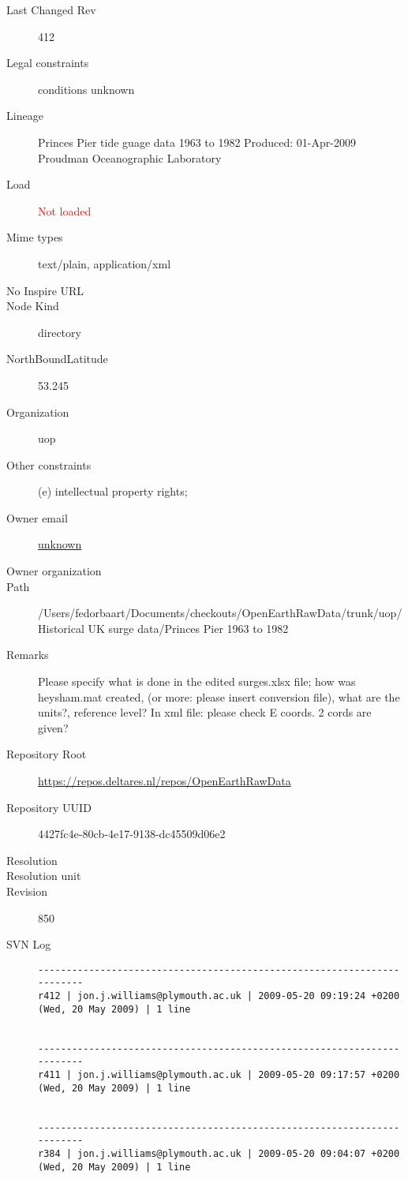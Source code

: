 \documentclass[9]{report}
\begin{document}
\begin{description}
  \item[Last Changed Rev] 412
  \item[Legal constraints] conditions unknown
  \item[Lineage] Princes Pier tide guage data 1963 to 1982
Produced: 01-Apr-2009
Proudman Oceanographic Laboratory
  \item[Load] \textcolor{red}{Not loaded}
  \item[Mime types] text/plain, application/xml
  \item[No Inspire URL] 
  \item[Node Kind] directory
  \item[NorthBoundLatitude] 53.245
  \item[Organization] uop
  \item[Other constraints] (e) intellectual property rights;
  \item[Owner email] \href{mailto:unknown}{unknown}
  \item[Owner organization] 
  \item[Path] /Users/fedorbaart/Documents/checkouts/OpenEarthRawData/trunk/uop/Historical UK surge data/Princes Pier 1963 to 1982
  \item[Remarks] Please specify what is done in the edited surges.xlsx file; how was heysham.mat created, (or more: please insert conversion file), what are the units?, reference level? In xml file: please check E coords. 2 cords are given?
  \item[Repository Root] \href{https://repos.deltares.nl/repos/OpenEarthRawData}{https://repos.deltares.nl/repos/OpenEarthRawData}
  \item[Repository UUID] 4427fc4e-80cb-4e17-9138-dc45509d06e2
  \item[Resolution] 
  \item[Resolution unit] 
  \item[Revision] 850
  \item[SVN Log] \begin{verbatim}
------------------------------------------------------------------------
r412 | jon.j.williams@plymouth.ac.uk | 2009-05-20 09:19:24 +0200 (Wed, 20 May 2009) | 1 line


------------------------------------------------------------------------
r411 | jon.j.williams@plymouth.ac.uk | 2009-05-20 09:17:57 +0200 (Wed, 20 May 2009) | 1 line


------------------------------------------------------------------------
r384 | jon.j.williams@plymouth.ac.uk | 2009-05-20 09:04:07 +0200 (Wed, 20 May 2009) | 1 line



\end{verbatim}
\end{description}
\end{document}
